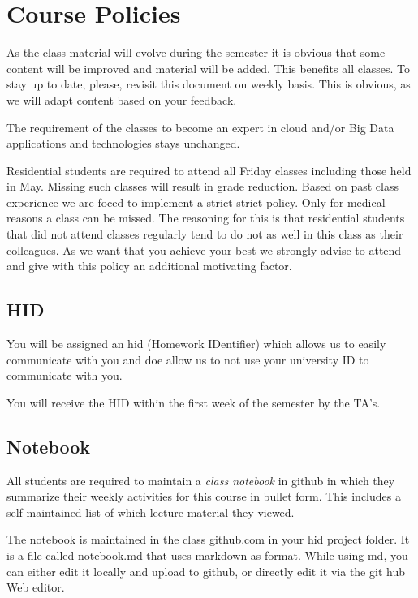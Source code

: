 
\chapter{Course Policies}\label{C:course-2018}

\FILENAME

\begin{WARNING}
  As the class material will evolve during the semester it is obvious
  that some content will be improved and material will be added. This
  benefits all classes. To stay up to date, please, revisit this
  document on weekly basis. This is obvious, as we will adapt content
  based on your feedback. 

  The requirement of the classes to become an expert in cloud and/or
  Big Data applications and technologies stays unchanged.
\end{WARNING}


Residential students are required to attend all Friday classes
including those held in May.  Missing such classes will result in
grade reduction. Based on past class experience we are foced to
implement a strict strict policy. Only for medical reasons a class can
be missed. The reasoning for this is that residential students that
did not attend classes regularly tend to do not as well in this class
as their colleagues. As we want that you achieve your best we strongly
advise to attend and give with this policy an additional motivating
factor.

\section{HID}

You will be assigned an hid (Homework IDentifier) which allows us to
easily communicate with you and doe allow us to not use your
university ID to communicate with you. 

You will receive the HID within the first week of the semester by the
TA's.

\section{Notebook}\label{notebook}

All students are required to maintain a \emph{class notebook} in
github in which they summarize their weekly activities for this course
in bullet form. This includes a self maintained list of which lecture
material they viewed.

The notebook is maintained in the class github.com in your hid project
folder. It is a file called notebook.md that uses markdown as format.
While using md, you can either edit it locally and upload to github, or
directly edit it via the git hub Web editor.

